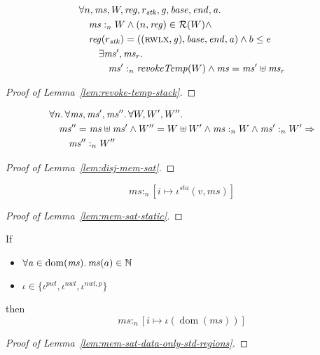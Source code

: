 \documentclass[a4paper]{article}
\DeclareMathOperator{\dom}{dom}
\newcommand{\var}[1]{\mathit{#1}}
\newcommand{\hs}{\var{ms}}
\newcommand{\ms}{\hs}
\newcommand{\gl}{\var{g}}
\newcommand{\addr}{\var{a}}
\newcommand{\start}{\var{base}}
\newcommand{\addrend}{\var{end}}
\newcommand{\reg}{\var{reg}}
\newcommand{\heap}{\var{mem}}
\newcommand{\stk}{\var{stk}}
\newcommand{\nwl}{\var{nwl}}
\newcommand{\pwl}{\var{pwl}}
\newcommand{\sta}{\var{sta}}
\newcommand{\plainfun}[2]{
  \ifthenelse{\equal{#2}{}}
  {\mathit{#1}}
  {\mathit{#1}(#2)}
}
\newcommand{\revokeTemp}[1]{\plainfun{revokeTemp}{#1}}
\newcommand{\heapSat}[3][\heap]{#1 :_{#2} #3}
\newcommand{\memSat}[3][n]{\heapSat[#2]{#1}{#3}}
\newcommand{\asmType}{\plaindom{AsmType}}
\newcommand{\plaindom}[1]{\mathrm{#1}}
\newcommand{\nats}{\mathbb{N}}
\newcommand{\intr}[2]{\mathcal{#1}}
\newcommand{\regintr}[1]{\intr{R}{#1}}
\newcommand{\stdrr}{\regintr{\asmType}}
\newcommand{\npair}[2][n]{\left(#1,#2 \right)}
\newcommand{\plainperm}[1]{\textsc{#1}}
\newcommand{\rwlx}{\plainperm{rwlx}}
\begin{document}
\begin{lemma}
  \label{lem:revoke-temp-stack}
  \begin{align*}
    & \forall n, \ms, W, \reg, r_\stk,\gl,\start,\addrend,\addr \ldotp\\
    & \quad \memSat{\ms}{W} \land \npair{\reg} \in \stdrr(W) \land \\
    & \quad \reg(r_\stk) = ((\rwlx,\gl),\start,\addrend,\addr) \land b \leq e \\
    & \qquad \exists \ms', \ms_r \ldotp \\
    & \qquad \quad \memSat{\ms'}{\revokeTemp{W}} \land \ms = \ms' \uplus \ms_r
  \end{align*}
\end{lemma}
\begin{proof}[Proof of Lemma~\ref{lem:revoke-temp-stack}]
\end{proof}

\begin{lemma}
  \label{lem:disj-mem-sat}
  \begin{align*}
    & \forall n \ldotp \forall \ms, \ms', \ms'' \ldotp \forall W, W', W'' \ldotp\\
    & \quad \ms'' = \ms \uplus \ms' \land W'' = W \uplus W' \land \memSat{\ms}{W} \land \memSat{\ms'}{W'} \Rightarrow \\
    & \qquad \heapSat[\ms'']{n}{W''}
  \end{align*}
\end{lemma}
\begin{proof}[Proof of Lemma~\ref{lem:disj-mem-sat}]
\end{proof}

\begin{lemma}
  \label{lem:mem-sat-static}
  \[
    \memSat{\ms}{[i \mapsto \iota^\sta(v,\ms)]}
  \]
\end{lemma}
\begin{proof}[Proof of Lemma~\ref{lem:mem-sat-static}]
\end{proof}

\begin{lemma}
  \label{lem:mem-sat-data-only-std-regions}
  If
  \begin{itemize}
  \item $\forall \addr \in \dom(\ms)\ldotp \ms(a) \in \nats$
  \item $\iota \in \{\iota^\pwl,\iota^\nwl,\iota^{\nwl,p} \}$
  \end{itemize}
  then
  \[
    \memSat{\ms}{[i \mapsto \iota(\dom(\ms))]}
  \]
\end{lemma}
\begin{proof}[Proof of Lemma~\ref{lem:mem-sat-data-only-std-regions}]
\end{proof}
\end{document}
